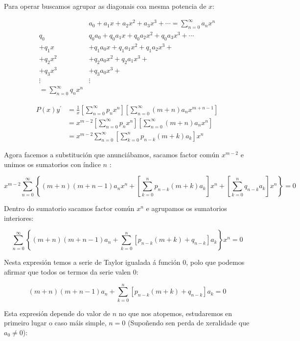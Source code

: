 \documentclass[a4paper,12pt,titlepage]{article}
\begin{document}
Para operar buscamos agrupar as diagonais coa mesma potencia de $x$:

$$
\begin{array}{c|l} 
& a_{0}+a_{1} x+a_{2} x^{2}+a_{3} x^{3}+\cdots=\sum_{n=0}^{\infty} a_{n} x^{n} \\
\hline q_{0} & q_{0} a_{0}+q_{0} a_{1} x+q_{0} a_{2} x^{2}+q_{0} a_{3} x^{3}+\cdots \\
+q_{1} x & +q_{1} a_{0} x+q_{1} a_{1} x^{2}+q_{1} a_{2} x^{3}+ \\
+q_{2} x^{2} & +q_{2} a_{0} x^{2}+q_{2} a_{1} x^{3}+ \\
+q_{3} x^{3} & +q_{3} a_{0} x^{3}+ \\
\vdots & \vdots \\
=\sum_{n=0}^{\infty}q_nx^n &
\end{array}
$$

$$
\begin{aligned}
P(x) y^{\prime} & =\frac{1}{x}\left[\sum_{n=0}^{\infty} p_{n} x^{n}\right]\left[\sum_{n=0}^{\infty}(m+n) a_{n} x^{m+n-1}\right] \\
& =x^{m-2}\left[\sum_{n=0}^{\infty} p_{n} x^{n}\right]\left[\sum_{n=0}^{\infty}(m+n) a_{n} x^{n}\right] \\
& =x^{m-2} \sum_{n=0}^{\infty}\left[\sum_{k=0}^{n} p_{n-k}(m+k) a_{k}\right] x^{n}
\end{aligned}
$$

Agora facemos a substitución que anunciábamos, sacamos factor común $x^{m-2}$ e unimos os sumatorios con índice $n$ :

$$
x^{m-2} \sum_{n=0}^{\infty}\left\{(m+n)(m+n-1) a_{n} x^{n}+\left[\sum_{k=0}^{n} p_{n-k}(m+k) a_{k}\right] x^{n}+\left[\sum_{k=0}^{n} q_{n-k} a_{k}\right] x^{n}\right\}=0
$$

Dentro do sumatorio sacamos factor común $x^{n}$ e agrupamos os sumatorios interiores:

$$
\sum_{n=0}^{\infty}\left\{(m+n)(m+n-1) a_{n}+\sum_{k=0}^{n}\left[p_{n-k}(m+k)+q_{n-k}\right] a_{k}\right\} x^{n}=0
$$

Nesta expresión temos a serie de Taylor igualada á función 0, polo que podemos afirmar que todos os termos da serie valen 0:

\begin{equation*}
    (m+n)(m+n-1) a_{n}+\sum_{k=0}^{n}\left[p_{n-k}(m+k)+q_{n-k}\right] a_{k} = 0
\end{equation*}

Esta expresión depende do valor de $n$ no que nos atopemos, estudaremos en primeiro lugar o caso máis simple, $n=0$ (Supoñendo sen perda de xeralidade que $a_0 \neq 0$):
\end{document}
